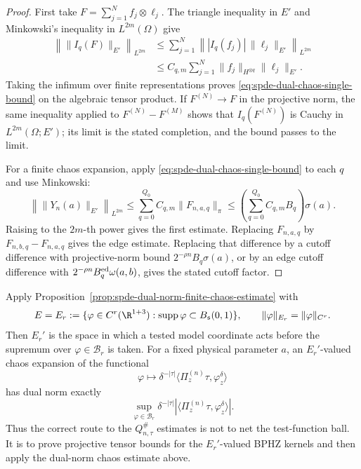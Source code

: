 \begin{proof}
First take \(F=\sum_{j=1}^N f_j\otimes\ell_j\).  The triangle inequality in
\(E'\) and Minkowski's inequality in \(L^{2m}(\Omega)\) give
\[
\begin{aligned}
  \left\|\|I_q(F)\|_{E'}\right\|_{L^{2m}}
  &\leq
  \sum_{j=1}^N
  \left\||I_q(f_j)|\,\|\ell_j\|_{E'}\right\|_{L^{2m}}       \\
  &\leq
  C_{q,m}\sum_{j=1}^N\|f_j\|_{H^{\otimes q}}\|\ell_j\|_{E'} .
\end{aligned}
\]
Taking the infimum over finite representations proves
\eqref{eq:spde-dual-chaos-single-bound} on the algebraic tensor product.
If \(F^{(N)}\to F\) in the projective norm, the same inequality applied to
\(F^{(N)}-F^{(M)}\) shows that \(I_q(F^{(N)})\) is Cauchy in
\(L^{2m}(\Omega;E')\); its limit is the stated completion, and the bound
passes to the limit.

For a finite chaos expansion, apply
\eqref{eq:spde-dual-chaos-single-bound} to each \(q\) and use Minkowski:
\[
  \left\|\|Y_n(a)\|_{E'}\right\|_{L^{2m}}
  \leq
  \sum_{q=0}^{Q_0}
  C_{q,m}\|F_{n,a,q}\|_\pi
  \leq
  \left(\sum_{q=0}^{Q_0}C_{q,m}B_q\right)\sigma(a).
\]
Raising to the \(2m\)-th power gives the first estimate.  Replacing
\(F_{n,a,q}\) by \(F_{n,b,q}-F_{n,a,q}\) gives the edge estimate.  Replacing
that difference by a cutoff difference with projective-norm bound
\(2^{-\rho n}B_q\sigma(a)\), or by an edge cutoff difference with
\(2^{-\rho n}B_q^{\rm ed}\omega(a,b)\), gives the stated cutoff factor.
\end{proof}

Apply Proposition~\ref{prop:spde-dual-norm-finite-chaos-estimate} with
\[
  E=E_r:=
  \{\varphi\in C^r(\R^{1+3}):
    \operatorname{supp}\varphi\subset B_{\mathfrak s}(0,1)\},
  \qquad
  \|\varphi\|_{E_r}=\|\varphi\|_{C^r}.
\]
Then \(E_r'\) is the space in which a tested model coordinate acts before
the supremum over \(\varphi\in\mathcal B_r\) is taken.  For a fixed physical
parameter \(a\), an \(E_r'\)-valued chaos expansion of the functional
\[
  \varphi\longmapsto
  \delta^{-|\tau|}
  \langle\Pi_z^{(n)}\tau,\varphi_z^\delta\rangle
\]
has dual norm exactly
\[
  \sup_{\varphi\in\mathcal B_r}
  \delta^{-|\tau|}
  |\langle\Pi_z^{(n)}\tau,\varphi_z^\delta\rangle|.
\]
Thus the correct route to the \(Q_{n,\tau}^{\#}\) estimates is not to net the
test-function ball.  It is to prove projective tensor bounds for the
\(E_r'\)-valued BPHZ kernels and then apply the dual-norm chaos estimate
above.

